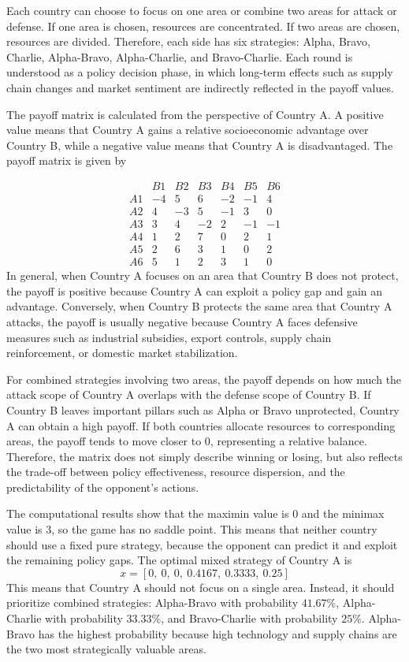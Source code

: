 \documentclass[12pt,a4paper]{article}
\begin{document}
Each country can choose to focus on one area or combine two areas for attack or defense. If one area is chosen, resources are concentrated. If two areas are chosen, resources are divided. Therefore, each side has six strategies: Alpha, Bravo, Charlie, Alpha-Bravo, Alpha-Charlie, and Bravo-Charlie. Each round is understood as a policy decision phase, in which long-term effects such as supply chain changes and market sentiment are indirectly reflected in the payoff values.

The payoff matrix is calculated from the perspective of Country A. A positive value means that Country A gains a relative socioeconomic advantage over Country B, while a negative value means that Country A is disadvantaged. The payoff matrix is given by

\begingroup
\small
\renewcommand{\arraystretch}{0.75}
\setlength{\arraycolsep}{4pt}
\[
\begin{array}{c|cccccc}
 & B1 & B2 & B3 & B4 & B5 & B6 \\
\hline
A1 & -4 & 5 & 6 & -2 & -1 & 4 \\
A2 & 4 & -3 & 5 & -1 & 3 & 0 \\
A3 & 3 & 4 & -2 & 2 & -1 & -1 \\
A4 & 1 & 2 & 7 & 0 & 2 & 1 \\
A5 & 2 & 6 & 3 & 1 & 0 & 2 \\
A6 & 5 & 1 & 2 & 3 & 1 & 0
\end{array}
\]
\endgroup
In general, when Country A focuses on an area that Country B does not protect, the payoff is positive because Country A can exploit a policy gap and gain an advantage. Conversely, when Country B protects the same area that Country A attacks, the payoff is usually negative because Country A faces defensive measures such as industrial subsidies, export controls, supply chain reinforcement, or domestic market stabilization.

For combined strategies involving two areas, the payoff depends on how much the attack scope of Country A overlaps with the defense scope of Country B. If Country B leaves important pillars such as Alpha or Bravo unprotected, Country A can obtain a high payoff. If both countries allocate resources to corresponding areas, the payoff tends to move closer to $0$, representing a relative balance. Therefore, the matrix does not simply describe winning or losing, but also reflects the trade-off between policy effectiveness, resource dispersion, and the predictability of the opponent's actions.

The computational results show that the maximin value is $0$ and the minimax value is $3$, so the game has no saddle point. This means that neither country should use a fixed pure strategy, because the opponent can predict it and exploit the remaining policy gaps. The optimal mixed strategy of Country A is
\[
x=[0,\ 0,\ 0,\ 0.4167,\ 0.3333,\ 0.25]
\]
This means that Country A should not focus on a single area. Instead, it should prioritize combined strategies: Alpha-Bravo with probability $41.67\%$, Alpha-Charlie with probability $33.33\%$, and Bravo-Charlie with probability $25\%$. Alpha-Bravo has the highest probability because high technology and supply chains are the two most strategically valuable areas.
\end{document}
